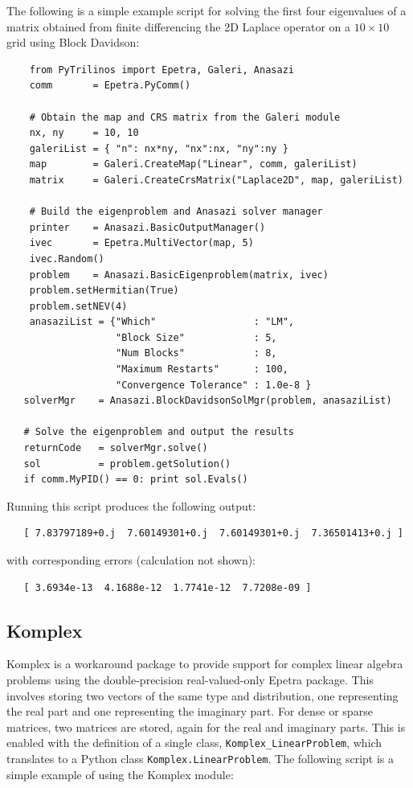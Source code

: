 \documentclass[11pt]{article}
\begin{document}
The following is a simple example script for solving the first four eigenvalues of a matrix obtained from finite differencing the 2D Laplace operator on a $10\times10$ grid using Block Davidson:
\begin{verbatim}
    from PyTrilinos import Epetra, Galeri, Anasazi
    comm       = Epetra.PyComm()

    # Obtain the map and CRS matrix from the Galeri module
    nx, ny     = 10, 10
    galeriList = { "n": nx*ny, "nx":nx, "ny":ny }
    map        = Galeri.CreateMap("Linear", comm, galeriList)
    matrix     = Galeri.CreateCrsMatrix("Laplace2D", map, galeriList)

    # Build the eigenproblem and Anasazi solver manager
    printer    = Anasazi.BasicOutputManager()
    ivec       = Epetra.MultiVector(map, 5)
    ivec.Random()
    problem    = Anasazi.BasicEigenproblem(matrix, ivec)
    problem.setHermitian(True)
    problem.setNEV(4)
    anasaziList = {"Which"                 : "LM",
                   "Block Size"            : 5,
                   "Num Blocks"            : 8,
                   "Maximum Restarts"      : 100,
                   "Convergence Tolerance" : 1.0e-8 }
   solverMgr    = Anasazi.BlockDavidsonSolMgr(problem, anasaziList)

   # Solve the eigenproblem and output the results
   returnCode   = solverMgr.solve()
   sol          = problem.getSolution()
   if comm.MyPID() == 0: print sol.Evals()
\end{verbatim}
Running this script produces the following output:
\begin{verbatim}
   [ 7.83797189+0.j  7.60149301+0.j  7.60149301+0.j  7.36501413+0.j ]
\end{verbatim}
with corresponding errors (calculation not shown):
\begin{verbatim}
   [ 3.6934e-13  4.1688e-12  1.7741e-12  7.7208e-09 ]
\end{verbatim}

\subsection{Komplex}
\label{sec:komplex}

Komplex is a workaround package to provide support for complex linear algebra problems using the double-precision real-valued-only Epetra package.  This involves storing two vectors of the same type and distribution, one representing the real part and one representing the imaginary part.  For dense or sparse matrices, two matrices are stored, again for the real and imaginary parts.  This is enabled with the definition of a single class, {\tt Komplex\_LinearProblem}, which translates to a Python class {\tt Komplex.LinearProblem}.  The following script is a simple example of using the Komplex module:
\end{document}
